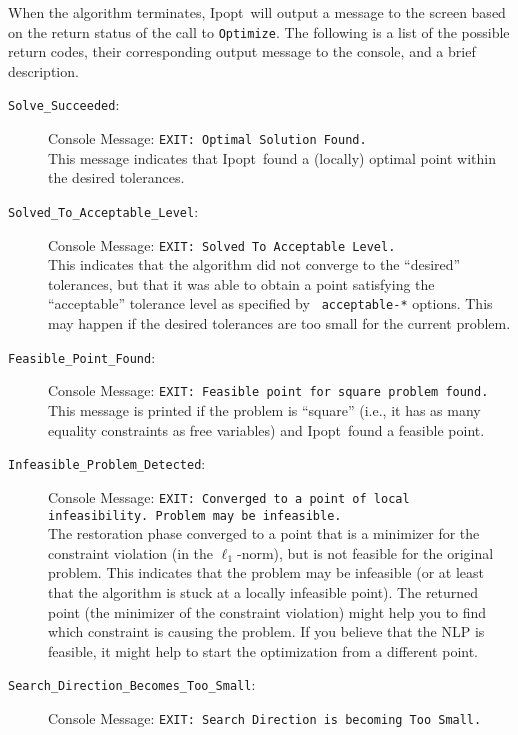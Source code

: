 \documentclass[10pt]{article}
\newcommand{\Ipopt}{{\sc Ipopt}}
\begin{document}
When the algorithm terminates, \Ipopt\ will output a message to the
screen based on the return status of the call to {\tt Optimize}. The following
is a list of the possible return codes, their corresponding output message
to the console, and a brief description.
\begin{description}
\item[{\tt Solve\_Succeeded}:] $\;$ \\
  Console Message: {\tt EXIT: Optimal Solution Found.} \\
  This message indicates that \Ipopt\ found a (locally) optimal point
  within the desired tolerances.
\item[{\tt Solved\_To\_Acceptable\_Level}:]  $\;$ \\
  Console Message: {\tt EXIT: Solved To Acceptable Level.} \\
  This indicates that the algorithm did not converge to the
  ``desired'' tolerances, but that it was able to obtain a point
  satisfying the ``acceptable'' tolerance level as specified by {\tt
    acceptable-*} options. This may happen if the desired tolerances
  are too small for the current problem.
\item[{\tt Feasible\_Point\_Found}:]  $\;$ \\
  Console Message: {\tt EXIT: Feasible point for square problem found.} \\
  This message is printed if the problem is ``square'' (i.e., it has
  as many equality constraints as free variables) and \Ipopt\ found a
  feasible point.
\item[{\tt Infeasible\_Problem\_Detected}:]  $\;$ \\
  Console Message: {\tt EXIT: Converged to a point of
    local infeasibility. Problem may be infeasible.} \\
  The restoration phase converged to a point that is a minimizer for
  the constraint violation (in the $\ell_1$-norm), but is not feasible
  for the original problem. This indicates that the problem may be
  infeasible (or at least that the algorithm is stuck at a locally
  infeasible point).  The returned point (the minimizer of the
  constraint violation) might help you to find which constraint is
  causing the problem.  If you believe that the NLP is feasible,
  it might help to start the optimization from a different point.
\item[{\tt Search\_Direction\_Becomes\_Too\_Small}:]  $\;$ \\
  Console Message: {\tt EXIT: Search Direction is becoming Too Small.} \\

\end{description}
\end{document}
